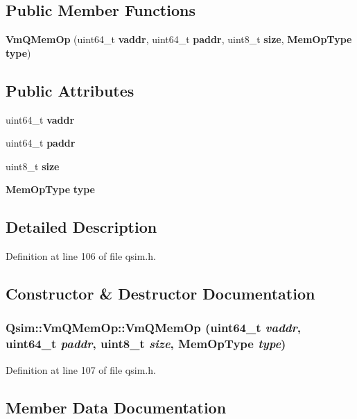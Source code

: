 \subsection*{Public Member Functions}
\begin{CompactItemize}
\item 
{\bf VmQMemOp} (uint64\_\-t {\bf vaddr}, uint64\_\-t {\bf paddr}, uint8\_\-t {\bf size}, {\bf MemOpType} {\bf type})
\end{CompactItemize}
\subsection*{Public Attributes}
\begin{CompactItemize}
\item 
uint64\_\-t {\bf vaddr}
\item 
uint64\_\-t {\bf paddr}
\item 
uint8\_\-t {\bf size}
\item 
{\bf MemOpType} {\bf type}
\end{CompactItemize}


\subsection{Detailed Description}


Definition at line 106 of file qsim.h.

\subsection{Constructor \& Destructor Documentation}
\subsubsection[{VmQMemOp}]{\setlength{\rightskip}{0pt plus 5cm}Qsim::VmQMemOp::VmQMemOp (uint64\_\-t {\em vaddr}, \/  uint64\_\-t {\em paddr}, \/  uint8\_\-t {\em size}, \/  {\bf MemOpType} {\em type})\hspace{0.3cm}{\tt  [inline]}}\label{structQsim_1_1VmQMemOp_de2be2afe65bda8fc428997880df84ac}




Definition at line 107 of file qsim.h.

\subsection{Member Data Documentation}
